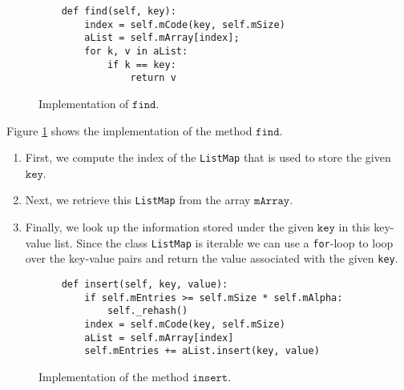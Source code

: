 \begin{figure}[!ht]
\centering
\begin{verbatim}
    def find(self, key):
        index = self.mCode(key, self.mSize)
        aList = self.mArray[index];
        for k, v in aList:
            if k == key:
                return v
\end{verbatim}
\vspace*{-0.3cm}
\caption{Implementation of $\texttt{find}$.}
\label{fig:HashMap.ipynb-find}
\end{figure}

Figure \ref{fig:HashMap.ipynb-find} shows the implementation of the method $\texttt{find}$.
\begin{enumerate}
\item First, we compute the index of the \texttt{ListMap} that is used to store the given
      $\texttt{key}$.
\item Next, we retrieve this \texttt{ListMap} from the array $\texttt{mArray}$.
\item Finally, we look up the information stored under the given $\texttt{key}$ in this key-value list.
      Since the class \texttt{ListMap} is iterable we can use a \texttt{for}-loop to loop over the key-value
      pairs and return the value associated with the given \texttt{key}.
\end{enumerate}

\begin{figure}[!ht]
\centering
\begin{verbatim}
    def insert(self, key, value):
        if self.mEntries >= self.mSize * self.mAlpha:
            self._rehash()
        index = self.mCode(key, self.mSize)
        aList = self.mArray[index]
        self.mEntries += aList.insert(key, value)
\end{verbatim}
\vspace*{-0.3cm}
\caption{Implementation of the method $\texttt{insert}$.}
\label{fig:hashTable.ipython-insert}
\end{figure}

